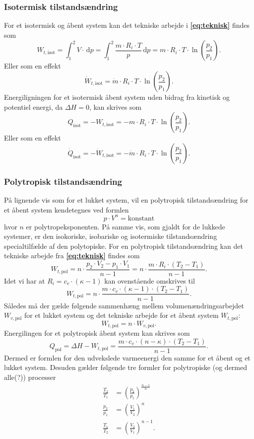 \subsubsection{Isotermisk tilstandsændring}
For et isotermisk og åbent system kan det tekniske arbejde i \textbf{\autoref{eq:teknisk}} findes som
\[ 
W_{t, \text{isot}} = \int_{1}^{2} V\cdot \, \mathrm{d}p = \int_{1}^{2} \frac{m \cdot R_i \cdot T}{p} \, \mathrm{d}p = m \cdot R_i \cdot T \cdot \ln \left( \frac{p_2}{p_1} \right)
.\]
Eller som en effekt
\[ 
\dot{W}_{t, \text{isot}} = \dot{m} \cdot R_i \cdot T \cdot \ln \left( \frac{p_2}{p_1} \right)
.\]
Energiligningen for et isotermisk åbent system uden bidrag fra kinetisk og potentiel energi, da $\Delta H = 0$, kan skrives som
\[ 
Q_{\text{isot}} = - W_{t, \text{isot}} = - m \cdot R_i \cdot T \cdot \ln \left( \frac{p_2}{p_1} \right)
.\]
Eller som en effekt
\[ 
\dot{Q}_{\text{isot}} = - \dot{W}_{t, \text{isot}} = -\dot{m} \cdot R_i \cdot T \cdot \ln \left( \frac{p_2}{p_1} \right)
.\]


\subsubsection{Polytropisk tilstandsændring}
På lignende vis som for et lukket system, vil en polytropisk tilstandsændring for et åbent system kendetegnes ved formlen
\[ 
p \cdot V^{n} = \mathrm{konstant}
\]
hvor $n$ er polytropeksponenten. På samme vis, som gjaldt for de lukkede systemer, er den isokoriske, isobariske og isotermiske tilstandsændring specialtilfælde af den polytopiske. For en polytropisk tilstandsændring kan det tekniske arbejde fra \textbf{\autoref{eq:teknisk}} findes som
\[ 
W_{t, \text{pol}} = n \cdot \frac{p_2 \cdot V_2 - p_1 \cdot V_1}{n-1} = n \cdot \frac{m \cdot R_i \cdot \left( T_2 - T_1 \right)}{n-1}
.\]
Idet vi har at $R_i = c_v \cdot \left( \kappa - 1 \right)$ kan ovenstående omskrives til
\[ 
W_{t, \text{pol}} = n \cdot \frac{m \cdot c_v \cdot \left( \kappa - 1 \right) \cdot \left( T_2 - T_1 \right)}{n-1}
.\]
Således må der gælde følgende sammenhæng mellem volumenændringsarbejdet $W_{v, \text{pol}}$ for et lukket system og det tekniske arbejde for et åbent system $W_{t, \text{pol}}$:
\[ 
W_{t, \text{pol}} = n \cdot W_{v, \text{pol}}
.\]
Energilingen for et polytropisk åbent system kan skrives som
\[ 
Q_{\text{pol}} = \Delta H - W_{t, \text{pol}} = \frac{m \cdot c_v \cdot \left( n - \kappa \right) \cdot \left( T_2 - T_1 \right)}{n-1}
.\]
Dermed er formlen for den udvekslede varmeenergi den samme for et åbent og et lukket system. Desuden gælder følgende tre formler for polytropiske (og dermed alle(?)) processer
\begin{align*}
  \frac{T_2}{T_1} &= \left( \frac{p_2}{p_1} \right)^{\frac{n-1}{n}} \\
  \frac{p_2}{p_1} &= \left( \frac{V_1}{V_2} \right)^{n} \\
  \frac{T_1}{T_2} &= \left( \frac{V_2}{V_1} \right)^{n-1}
.\end{align*}

